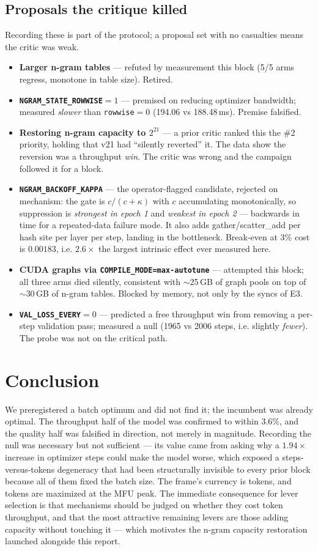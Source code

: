 \documentclass{article}
\begin{document}
\subsection{Proposals the critique killed}
\label{sec:killed}
Recording these is part of the protocol; a proposal set with no casualties means the critic
was weak.
\begin{itemize}\itemsep2pt
\item \textbf{Larger n-gram tables} --- refuted by measurement this block (5/5 arms regress,
monotone in table size). Retired.
\item \textbf{\texttt{NGRAM\_STATE\_ROWWISE}$=1$} --- premised on reducing optimizer
bandwidth; measured \emph{slower} than \texttt{rowwise}$=0$ (194.06 vs 188.48\,ms). Premise
falsified.
\item \textbf{Restoring n-gram capacity to $2^{21}$} --- a prior critic ranked this the \#2
priority, holding that v21 had ``silently reverted'' it. The data show the reversion was a
throughput \emph{win}. The critic was wrong and the campaign followed it for a block.
\item \textbf{\texttt{NGRAM\_BACKOFF\_KAPPA}} --- the operator-flagged candidate, rejected on
mechanism: the gate is $c/(c+\kappa)$ with $c$ accumulating monotonically, so suppression is
\emph{strongest in epoch 1} and \emph{weakest in epoch 2} --- backwards in time for a
repeated-data failure mode. It also adds gather/scatter\_add per hash site per layer per step,
landing in the bottleneck. Break-even at 3\% cost is $0.00183$, i.e. $2.6\times$ the largest
intrinsic effect ever measured here.
\item \textbf{CUDA graphs via \texttt{COMPILE\_MODE=max-autotune}} --- attempted this block;
all three arms died silently, consistent with $\sim$25\,GB of graph pools on top of
$\sim$30\,GB of n-gram tables. Blocked by memory, not only by the syncs of E3.
\item \textbf{\texttt{VAL\_LOSS\_EVERY}$=0$} --- predicted a free throughput win from
removing a per-step validation pass; measured a null (1965 vs 2006 steps, i.e. slightly
\emph{fewer}). The probe was not on the critical path.
\end{itemize}

\section{Conclusion}
We preregistered a batch optimum and did not find it; the incumbent was already optimal. The throughput half of the model was confirmed to within $3.6\%$, and the quality half was falsified in direction, not merely in magnitude. Recording the null was necessary but not sufficient --- its value came from asking why a $1.94\times$ increase in optimizer steps could make the model worse, which exposed a steps-versus-tokens degeneracy that had been structurally invisible to every prior block because all of them fixed the batch size. The frame's currency is tokens, and tokens are maximized at the MFU peak. The immediate consequence for lever selection is that mechanisms should be judged on whether they cost token throughput, and that the most attractive remaining levers are those adding capacity without touching it --- which motivates the n-gram capacity restoration launched alongside this report.
\end{document}
